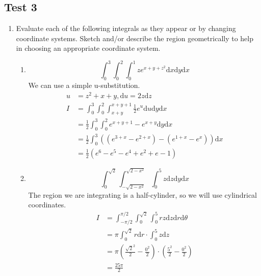 \subsection{Test 3}
\begin{enumerate}
	\item Evaluate each of the following integrals as they appear or by changing coordinate systems. Sketch and/or describe the region geometrically to help in choosing an appropriate coordinate system.
	\begin{enumerate}[label=\alph*.]
		\item \begin{equation*}
			\int_{0}^{3}{\int_{0}^{2}{\int_{0}^{1}{ze^{x+y+z^2}\mathrm{d}x}\mathrm{d}y}\mathrm{d}x}
		\end{equation*}
		We can use a simple u-substitution.
		\begin{align*}
			u &= z^2 + x + y, \mathrm{d}u = 2z\mathrm{d}z \\
			I &= \int_{0}^{3}{\int_{0}^{2}{\int_{x+y}^{x+y+1}{\frac{1}{2}e^{u}\mathrm{d}u}\mathrm{d}y}\mathrm{d}x} \\
			&= \frac{1}{2}\int_{0}^{3}{\int_{0}^{2}{e^{x+y+1} - e^{x+y}\mathrm{d}y}\mathrm{d}x} \\
			&= \frac{1}{2}\int_{0}^{3}{\left((e^{3+x}-e^{2+x}) - (e^{1+x}-e^{x})\right)\mathrm{d}x} \\
			&= \frac{1}{2}(e^6 - e^5 - e^4 + e^2 + e - 1)
		\end{align*}
		
		\item \begin{equation*}
			\int_{0}^{\sqrt{2}}{\int_{-\sqrt{2-x^2}}^{\sqrt{2-x^2}}{\int_{0}^{5}{z\mathrm{d}z}\mathrm{d}y}\mathrm{d}x}
		\end{equation*}
		The region we are integrating is a half-cylinder, so we will use cylindrical coordinates.
		\begin{align*}
			I &= \int_{-\pi/2}^{\pi/2}{\int_{0}^{\sqrt{2}}{\int_{0}^{5}{rz\mathrm{d}z}\mathrm{d}r}\mathrm{d}\theta} \\
			&= \pi\int_{0}^{\sqrt{2}}{r\mathrm{d}r}\cdot\int_{0}^{5}{z\mathrm{d}z} \\
			&= \pi\left(\frac{\sqrt{2}^{2}}{2} - \frac{0^2}{2}\right) \cdot \left(\frac{5^2}{2} - \frac{0^2}{2}\right) \\	
			&= \frac{25\pi}{2}
		\end{align*}
		

\end{enumerate}
\end{enumerate}
